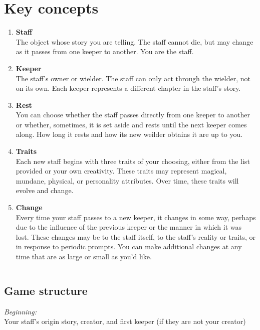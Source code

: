 \documentclass[
  a5paper,
]{article}
\begin{document}
\hypertarget{key-concepts}{%
\section{Key concepts}\label{key-concepts}}

\begin{enumerate}
\def\labelenumi{\arabic{enumi}.}
\item
  \textbf{Staff}\\
  The object whose story you are telling. The staff cannot die, but may change as it passes from one keeper to another. You are the staff.
\item
  \textbf{Keeper}\\
  The staff's owner or wielder. The staff can only act through the wielder, not on its own. Each keeper represents a different chapter in the staff's story.
\item
  \textbf{Rest}\\
  You can choose whether the staff passes directly from one keeper to another or whether, sometimes, it is set aside and rests until the next keeper comes along. How long it rests and how its new weilder obtains it are up to you.
\item
  \textbf{Traits}\\
  Each new staff begins with three traits of your choosing, either from the list provided or your own creativity. These traits may represent magical, mundane, physical, or personality attributes. Over time, these traits will evolve and change.
\item
  \textbf{Change}\\
  Every time your staff passes to a new keeper, it changes in some way, perhaps due to the influence of the previous keeper or the manner in which it was lost. These changes may be to the staff itself, to the staff's reality or traits, or in response to periodic prompts. You can make additional changes at any time that are as large or small as you'd like.
\end{enumerate}

\pagebreak

\(~\)

\hypertarget{game-structure}{%
\subsection{Game structure}\label{game-structure}}

\emph{Beginning:}\\
Your staff's origin story, creator, and first keeper (if they are not your creator)
\end{document}
